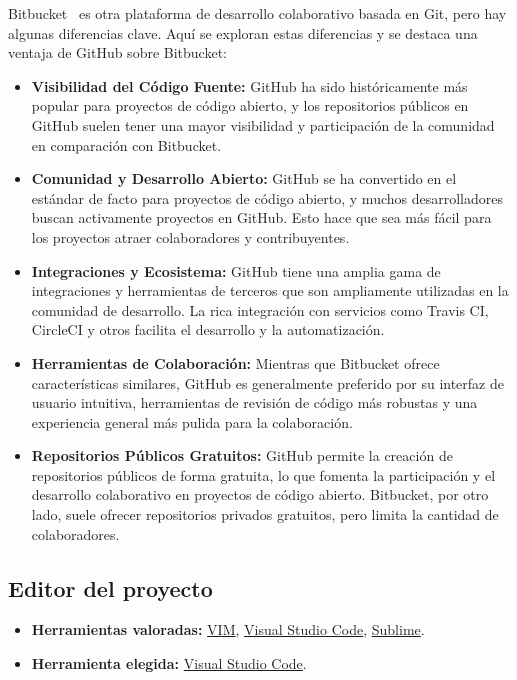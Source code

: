 Bitbucket~\cite{misc:Bitbucket} es otra plataforma de desarrollo colaborativo basada en Git, pero hay algunas diferencias clave. Aquí se exploran estas diferencias y se destaca una ventaja de GitHub sobre Bitbucket:

\begin{itemize}
	\item \textbf{Visibilidad del Código Fuente:}
		GitHub ha sido históricamente más popular para proyectos de código abierto, y los repositorios públicos en GitHub suelen tener una mayor visibilidad y participación de la comunidad en comparación con Bitbucket.

\item \textbf{Comunidad y Desarrollo Abierto:}
GitHub se ha convertido en el estándar de facto para proyectos de código abierto, y muchos desarrolladores buscan activamente proyectos en GitHub. Esto hace que sea más fácil para los proyectos atraer colaboradores y contribuyentes.

\item \textbf{Integraciones y Ecosistema:}
GitHub tiene una amplia gama de integraciones y herramientas de terceros que son ampliamente utilizadas en la comunidad de desarrollo. La rica integración con servicios como Travis CI, CircleCI y otros facilita el desarrollo y la automatización.

\item \textbf{Herramientas de Colaboración:}
Mientras que Bitbucket ofrece características similares, GitHub es generalmente preferido por su interfaz de usuario intuitiva, herramientas de revisión de código más robustas y una experiencia general más pulida para la colaboración.

\item \textbf{Repositorios Públicos Gratuitos:}
GitHub permite la creación de repositorios públicos de forma gratuita, lo que fomenta la participación y el desarrollo colaborativo en proyectos de código abierto. Bitbucket, por otro lado, suele ofrecer repositorios privados gratuitos, pero limita la cantidad de colaboradores.
\end{itemize}


\subsection{Editor del proyecto}\label{4:ATOM}
\begin{itemize}
    \item \textbf{Herramientas valoradas:} \href{https://www.vim.org/}{VIM}, \href{https://code.visualstudio.com/}{Visual Studio Code}, \href{https://www.sublimetext.com/}{Sublime}.
    \item \textbf{Herramienta elegida:} \href{https://code.visualstudio.com/}{Visual Studio Code}.
\end{itemize}

